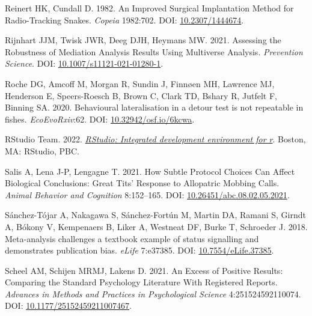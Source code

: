 \documentclass[10pt,a4paper]{article}
\newlength{\cslhangindent}
\newlength{\cslentryspacingunit} %
\newenvironment{CSLReferences}[2] %
 {%
  \setlength{\parindent}{0pt}
  \ifodd #1
  \let\oldpar\par
  \def\par{\hangindent=\cslhangindent\oldpar}
  \fi
  \setlength{\parskip}{#2\cslentryspacingunit}
 }%
 {}
\begin{document}
\begin{CSLReferences}{1}{0}
\leavevmode{}%
Reinert HK, Cundall D. 1982. An {Improved} {Surgical} {Implantation} {Method} for {Radio}-{Tracking} {Snakes}. \emph{Copeia} 1982:702. DOI: \href{https://doi.org/10.2307/1444674}{10.2307/1444674}.

\leavevmode{}%
Rijnhart JJM, Twisk JWR, Deeg DJH, Heymans MW. 2021. Assessing the {Robustness} of {Mediation} {Analysis} {Results} {Using} {Multiverse} {Analysis}. \emph{Prevention Science}. DOI: \href{https://doi.org/10.1007/s11121-021-01280-1}{10.1007/s11121-021-01280-1}.

\leavevmode{}%
Roche DG, Amcoff M, Morgan R, Sundin J, Finnøen MH, Lawrence MJ, Henderson E, Speers-Roesch B, Brown C, Clark TD, Bshary R, Jutfelt F, Binning SA. 2020. Behavioural lateralisation in a detour test is not repeatable in fishes. \emph{EcoEvoRxiv}:62. DOI: \href{https://doi.org/10.32942/osf.io/6kcwa}{10.32942/osf.io/6kcwa}.

\leavevmode{}%
RStudio Team. 2022. \emph{\href{http://www.rstudio.com/}{{RStudio}: Integrated development environment for r}}. Boston, MA: RStudio, PBC.

\leavevmode{}%
Salis A, Lena J-P, Lengagne T. 2021. How {Subtle} {Protocol} {Choices} {Can} {Affect} {Biological} {Conclusions}: {Great} {Tits}' {Response} to {Allopatric} {Mobbing} {Calls}. \emph{Animal Behavior and Cognition} 8:152--165. DOI: \href{https://doi.org/10.26451/abc.08.02.05.2021}{10.26451/abc.08.02.05.2021}.

\leavevmode{}%
Sánchez-Tójar A, Nakagawa S, Sánchez-Fortún M, Martin DA, Ramani S, Girndt A, Bókony V, Kempenaers B, Liker A, Westneat DF, Burke T, Schroeder J. 2018. Meta-analysis challenges a textbook example of status signalling and demonstrates publication bias. \emph{eLife} 7:e37385. DOI: \href{https://doi.org/10.7554/eLife.37385}{10.7554/eLife.37385}.

\leavevmode{}%
Scheel AM, Schijen MRMJ, Lakens D. 2021. An {Excess} of {Positive} {Results}: {Comparing} the {Standard} {Psychology} {Literature} {With} {Registered} {Reports}. \emph{Advances in Methods and Practices in Psychological Science} 4:251524592110074. DOI: \href{https://doi.org/10.1177/25152459211007467}{10.1177/25152459211007467}.


\end{CSLReferences}
\end{document}
